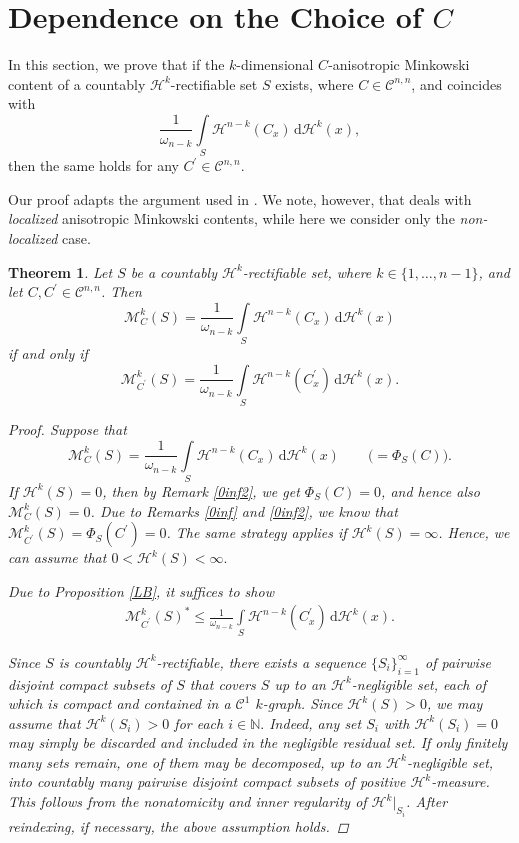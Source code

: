 \documentclass[pdflatex,sn-mathphys-num]{sn-jnl}
\theoremstyle{plain}
\newtheorem{theorem}{Theorem}[section]
\theoremstyle{definition}
\newcommand{\dH}[1]{\,\mathrm d\mathcal{H}^{#1}}
\begin{document}
\section{Dependence on the Choice of $C$}\label{secFurther}
In this section, we prove that if the $k$-dimensional $C$-anisotropic Minkowski content of a countably $\mathcal{H}^k$-rectifiable set $S$ exists, where $C\in\mathcal{C}^{n, n}$, and coincides with $$\frac{1}{\omega_{n-k}}\int\limits_{S}\mathcal{H}^{n-k}(C_x)\dH{k}(x),$$ then the same holds for any $C^{\prime}\in\mathcal{C}^{n, n}.$ 

Our proof adapts the argument used in \cite[Theorem 3.1]{frys}. We note, however, that \cite[Theorem 3.1]{frys} deals with \emph{localized} anisotropic Minkowski contents, while here we consider only the \emph{non-localized} case.
\begin{theorem}
\label{theoremExistence}
Let $S$ be a countably $\mathcal{H}^k$-rectifiable set, where $k\in\{1, \dots, n-1\}$, and let $C, C^{\prime}\in\mathcal{C}^{n, n}$. Then
\[
\mathcal{M}^k_C(S)=\frac{1}{\omega_{n-k}}\int\limits_{S}\mathcal{H}^{n-k}(C_x)\dH{k}(x)
\]
if and only if
\[
\mathcal{M}^k_{C^{\prime}}(S)=\frac{1}{\omega_{n-k}}\int\limits_{S}\mathcal{H}^{n-k}(C^{\prime}_x)\dH{k}(x). 
\]
\begin{proof}
Suppose that
\[
\mathcal{M}^k_C(S)=\frac{1}{\omega_{n-k}}\int\limits_{S}\mathcal{H}^{n-k}(C_x)\dH{k}(x)\qquad \big(=\Phi_S(C)\big).
\]
If $\mathcal{H}^k(S)=0$, then by Remark \ref{0inf2}, we get  $\Phi_S(C)=0$, and hence also $\mathcal{M}^k_C(S)=0$. Due to Remarks \ref{0inf} and \ref{0inf2}, we know that $\mathcal{M}^k_{C^{\prime}}(S)=\Phi_S(C^{\prime})=0$. The same strategy applies if $\mathcal{H}^k(S)=\infty$. Hence, we can assume that $0<\mathcal{H}^k(S)<\infty.$

Due to Proposition \ref{LB}, it suffices to show
\begin{align}\label{nikl}
\mathcal{M}^k_{C^{\prime}}(S)^*\leq\frac{1}{\omega_{n-k}}\int\limits_{S}\mathcal{H}^{n-k}(C^{\prime}_x)\dH{k}(x).
\end{align}

Since $S$ is countably $\mathcal{H}^{k}$-rectifiable, there exists a sequence $\{S_i\}_{i=1}^{\infty}$ of pairwise disjoint compact subsets of $S$ that covers $S$ up to an $\mathcal{H}^{k}$-negligible set, each of which is compact and contained in a $\mathcal C^1$ $k$-graph. 
Since $\mathcal{H}^k(S)>0$, we may assume that $\mathcal{H}^k(S_i)>0$ for each $i\in\mathbb{N}.$ Indeed, any set \(S_i\) with \(\mathcal H^k(S_i)=0\) may simply be
discarded and included in the negligible residual set. If only finitely
many sets remain, one of them may be decomposed, up to an
\(\mathcal H^k\)-negligible set, into countably many pairwise disjoint
compact subsets of positive \(\mathcal H^k\)-measure. This follows from
the nonatomicity and inner regularity of
\(\mathcal H^k\big|_{S_i}\). After reindexing, if necessary, the above assumption holds.


\end{proof}
\end{theorem}
\end{document}
